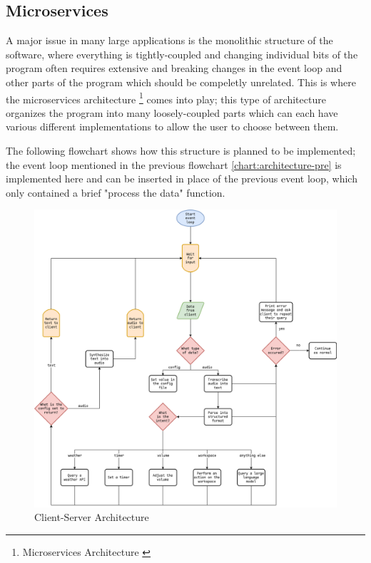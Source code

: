 \subsection{Microservices}
A major issue in many large applications is the monolithic structure of the software,
where everything is tightly-coupled and changing individual bits of the program
often requires extensive and breaking changes in the event loop and other parts of the program
which should be compeletly unrelated.
This is where the microservices architecture \footnote{Microservices Architecture \cite{microservices}}
comes into play; this type of architecture organizes the program into many loosely-coupled parts
which can each have various different implementations to allow the user to choose between them.

The following flowchart shows how this structure is planned to be implemented; the event loop mentioned in the previous flowchart \ref{chart:architecture-pre}
is implemented here and can be inserted in place of the previous event loop, which only contained a brief "process the data" function.

\begin{figure}[H]
\centering
\includegraphics[width=\textwidth]{assets/processing-pre}
\caption{Client-Server Architecture}
\label{chart:processing-pre}
\end{figure}

